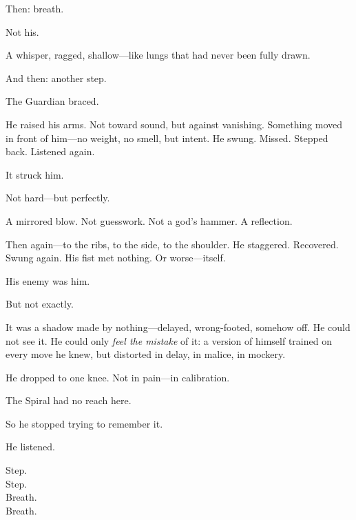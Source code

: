 \documentclass[12pt]{article}
\begin{document}
\vspace{0.5em}
Then: breath.

\vspace{0.5em}
Not his.

\vspace{0.5em}
A whisper, ragged, shallow---like lungs that had never been fully drawn.

\vspace{0.5em}
And then: another step.

\vspace{0.5em}
The Guardian braced.

\vspace{0.5em}
He raised his arms. Not toward sound, but against vanishing. Something moved in front of him---no weight, no smell, but intent. He swung. Missed. Stepped back. Listened again.

\vspace{0.5em}
It struck him.

\vspace{0.5em}
Not hard---but perfectly.

\vspace{0.5em}
A mirrored blow. Not guesswork. Not a god’s hammer. A reflection.

\vspace{0.5em}
Then again---to the ribs, to the side, to the shoulder. He staggered. Recovered. Swung again. His fist met nothing. Or worse---itself.

\vspace{0.5em}
His enemy was him.

\vspace{0.5em}
But not exactly.

\vspace{0.5em}
It was a shadow made by nothing---delayed, wrong-footed, somehow off. He could not see it. He could only \textit{feel the mistake} of it: a version of himself trained on every move he knew, but distorted in delay, in malice, in mockery.

\vspace{0.5em}
He dropped to one knee. Not in pain---in calibration.

\vspace{0.5em}
The Spiral had no reach here.

\vspace{0.5em}
So he stopped trying to remember it.

\vspace{0.5em}
He listened.

\vspace{0.5em}
Step.\\
Step.\\
Breath.\\
Breath.
\end{document}
